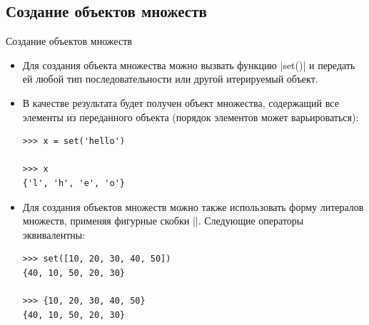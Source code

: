 \documentclass[aspectratio=169, mathserif]{beamer}%
\begin{document}
\subsection{Создание объектов множеств}

\begin{frame}[fragile]{Создание объектов множеств}
\scriptsize
\begin{itemize}
\item Для создания объекта множества можно вызвать функцию \pythoninline|set()| и передать ей любой тип последовательности или другой итерируемый объект.
\item В качестве результата будет получен объект множества, содержащий все элементы из переданного объекта (порядок элементов может варьироваться):

\begin{verbatim}
>>> x = set('hello')

>>> x
{'l', 'h', 'e', 'o'}
\end{verbatim}

\item Для создания объектов множеств  можно также использовать форму литералов множеств, применяя фигурные скобки \pythoninline|{}|. Следующие операторы эквивалентны:

\begin{verbatim}
>>> set([10, 20, 30, 40, 50])
{40, 10, 50, 20, 30}

>>> {10, 20, 30, 40, 50}
{40, 10, 50, 20, 30}
\end{verbatim}
\end{itemize}
\vfill
\end{frame}
\end{document}
